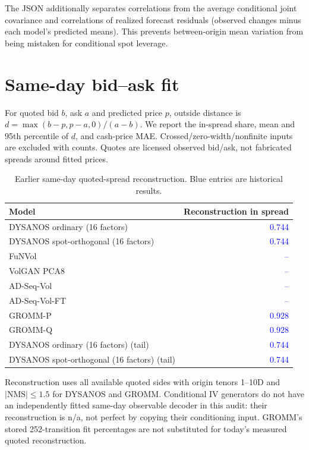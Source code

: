 \documentclass[11pt]{article}
\begin{document}
The JSON additionally separates correlations from the average conditional joint covariance and correlations of realized forecast residuals (observed changes minus each model's predicted means). This prevents between-origin mean variation from being mistaken for conditional spot leverage.

\section{Same-day bid--ask fit}

For quoted bid $b$, ask $a$ and predicted price $p$, outside distance is $d=\max(b-p,p-a,0)/(a-b)$. We report the in-spread share, mean and 95th percentile of $d$, and cash-price MAE. Crossed/zero-width/nonfinite inputs are excluded with counts. Quotes are licensed observed bid/ask, not fabricated spreads around fitted prices.

\begin{table}[H]\centering\small
\caption{Earlier same-day quoted-spread reconstruction. Blue entries are historical results.}\label{tab:bidask-fit}
\begin{tabular}{@{}lr@{}}\toprule Model & Reconstruction in spread \\
\midrule
DYSANOS ordinary (16 factors) & \textcolor{blue}{0.744} \\
DYSANOS spot-orthogonal (16 factors) & \textcolor{blue}{0.744} \\
FuNVol & \textcolor{blue}{--} \\
VolGAN PCA8 & \textcolor{blue}{--} \\
AD-Seq-Vol & \textcolor{blue}{--} \\
AD-Seq-Vol-FT & \textcolor{blue}{--} \\
GROMM-P & \textcolor{blue}{0.928} \\
GROMM-Q & \textcolor{blue}{0.928} \\
DYSANOS ordinary (16 factors) (tail) & \textcolor{blue}{0.744} \\
DYSANOS spot-orthogonal (16 factors) (tail) & \textcolor{blue}{0.744} \\
\bottomrule\end{tabular}\end{table}

Reconstruction uses all available quoted sides with origin tenors 1--10D and $|\mathrm{NMS}|\le1.5$ for DYSANOS and GROMM. Conditional IV generators do not have an independently fitted same-day observable decoder in this audit: their reconstruction is n/a, not perfect by copying their conditioning input. GROMM's stored 252-transition fit percentages are not substituted for today's measured quoted reconstruction.
\end{document}
